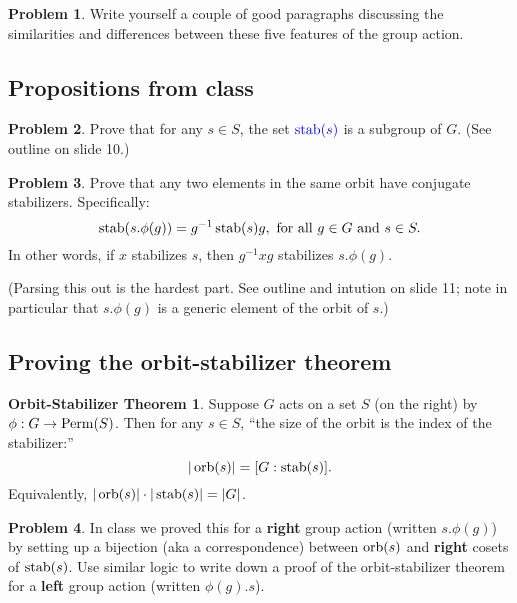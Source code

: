 \documentclass[12pt]{article}
\theoremstyle{definition} %
\newtheorem{problem}{Problem}
\newtheorem*{obs}{Orbit-Stabilizer Theorem}
\newcommand\inv{^{-1}} %
\begin{document}
\hrulefill

\begin{problem}
  Write yourself a couple of good paragraphs discussing the similarities and differences between these five features of the group action.
\end{problem}

\newpage

\subsection*{Propositions from class}

\begin{problem}
  Prove that for any $s\in S$, the set $\Balert{\stab(s)}$ is a subgroup of $G$. (See outline on slide 10.)
\end{problem}

\begin{problem}\label{conj-stab}
  Prove that any two elements in the same orbit have conjugate stabilizers. Specifically:
  \[\stab(s.\phi(g)) = g\inv \stab(s) g, \text{ for all } g\in G \text{ and } s\in S.\]
  In other words, if $x$ stabilizes $s$, then $g\inv x g$ stabilizes $s.\phi(g)$.

  (Parsing this out is the hardest part. See outline and intution on slide 11; note in particular that $s.\phi(g)$ is a generic element of the orbit of $s$.)
\end{problem}

\subsection*{Proving the orbit-stabilizer theorem}

\begin{obs}
Suppose $G$ acts on a set $S$ (on the right) by $\phi: G\to \operatorname{Perm}(S)$. Then for any $s\in S$, ``the size of the orbit is the index of the stabilizer:''
\[|\operatorname{orb}(s)| = [G:\operatorname{stab}(s)].\] 
Equivalently, $|\operatorname{orb}(s)| \cdot |\operatorname{stab}(s)| = |G|$.
\end{obs}

\begin{problem}
  In class we proved this for a \textbf{right} group action (written $s.\phi(g)$) by setting up a bijection (aka a correspondence) between $\operatorname{orb}(s)$ and \textbf{right} cosets of $\operatorname{stab}(s)$. Use similar logic to write down a proof of the orbit-stabilizer theorem for a \textbf{left} group action (written $\phi(g).s$).
\end{problem}
\end{document}
